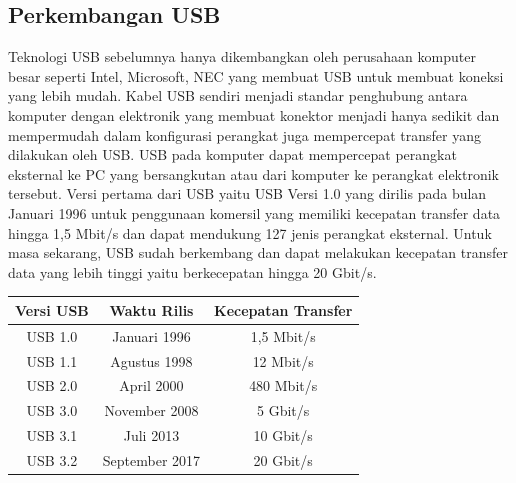 \subsection{Perkembangan USB}
Teknologi USB sebelumnya hanya dikembangkan oleh perusahaan komputer besar seperti Intel, Microsoft, NEC yang membuat USB untuk membuat koneksi yang lebih mudah. Kabel USB sendiri menjadi standar penghubung antara komputer dengan elektronik yang membuat konektor menjadi hanya sedikit dan mempermudah dalam konfigurasi perangkat juga mempercepat transfer yang dilakukan oleh USB. USB pada komputer dapat mempercepat perangkat eksternal ke PC yang bersangkutan atau dari komputer ke perangkat elektronik tersebut.
\break
Versi pertama dari USB yaitu USB Versi 1.0 yang dirilis pada bulan Januari 1996 untuk penggunaan komersil yang memiliki kecepatan transfer data hingga 1,5 Mbit/s dan dapat mendukung 127 jenis perangkat eksternal. Untuk masa sekarang, USB sudah berkembang dan dapat 
melakukan kecepatan transfer data yang lebih tinggi yaitu berkecepatan hingga 20 Gbit/s.
\break
\begin{center}
\begin{tabular}{||c c c||} 
\hline
Versi USB & Waktu Rilis & Kecepatan Transfer \\ [0.5ex] 
\hline\hline
USB 1.0 & Januari 1996 & 1,5 Mbit/s\\ 
\hline
USB 1.1 & Agustus 1998 & 12 Mbit/s\\
\hline
USB 2.0 & April 2000 & 480 Mbit/s\\
\hline
USB 3.0 & November 2008 & 5 Gbit/s \\
\hline
USB 3.1 & Juli 2013 & 10 Gbit/s \\
\hline
USB 3.2 & September 2017 & 20 Gbit/s\\ [1ex] 
\hline
\end{tabular}
\end{center}

